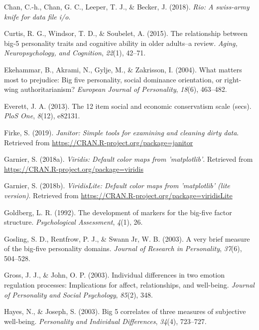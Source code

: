\documentclass[man]{apa6}
\begin{document}
\leavevmode\hypertarget{ref-R-rio}{}%
Chan, C.-h., Chan, G. C., Leeper, T. J., \& Becker, J. (2018). \emph{Rio: A swiss-army knife for data file i/o}.

\leavevmode\hypertarget{ref-curtis2015relationship}{}%
Curtis, R. G., Windsor, T. D., \& Soubelet, A. (2015). The relationship between big-5 personality traits and cognitive ability in older adults--a review. \emph{Aging, Neuropsychology, and Cognition}, \emph{22}(1), 42--71.

\leavevmode\hypertarget{ref-ekehammar2004matters}{}%
Ekehammar, B., Akrami, N., Gylje, M., \& Zakrisson, I. (2004). What matters most to prejudice: Big five personality, social dominance orientation, or right-wing authoritarianism? \emph{European Journal of Personality}, \emph{18}(6), 463--482.

\leavevmode\hypertarget{ref-everett201312}{}%
Everett, J. A. (2013). The 12 item social and economic conservatism scale (secs). \emph{PloS One}, \emph{8}(12), e82131.

\leavevmode\hypertarget{ref-R-janitor}{}%
Firke, S. (2019). \emph{Janitor: Simple tools for examining and cleaning dirty data}. Retrieved from \url{https://CRAN.R-project.org/package=janitor}

\leavevmode\hypertarget{ref-R-viridis}{}%
Garnier, S. (2018a). \emph{Viridis: Default color maps from 'matplotlib'}. Retrieved from \url{https://CRAN.R-project.org/package=viridis}

\leavevmode\hypertarget{ref-R-viridisLite}{}%
Garnier, S. (2018b). \emph{ViridisLite: Default color maps from 'matplotlib' (lite version)}. Retrieved from \url{https://CRAN.R-project.org/package=viridisLite}

\leavevmode\hypertarget{ref-goldberg1992development}{}%
Goldberg, L. R. (1992). The development of markers for the big-five factor structure. \emph{Psychological Assessment}, \emph{4}(1), 26.

\leavevmode\hypertarget{ref-gosling2003very}{}%
Gosling, S. D., Rentfrow, P. J., \& Swann Jr, W. B. (2003). A very brief measure of the big-five personality domains. \emph{Journal of Research in Personality}, \emph{37}(6), 504--528.

\leavevmode\hypertarget{ref-gross2003individual}{}%
Gross, J. J., \& John, O. P. (2003). Individual differences in two emotion regulation processes: Implications for affect, relationships, and well-being. \emph{Journal of Personality and Social Psychology}, \emph{85}(2), 348.

\leavevmode\hypertarget{ref-hayes2003big}{}%
Hayes, N., \& Joseph, S. (2003). Big 5 correlates of three measures of subjective well-being. \emph{Personality and Individual Differences}, \emph{34}(4), 723--727.
\end{document}
